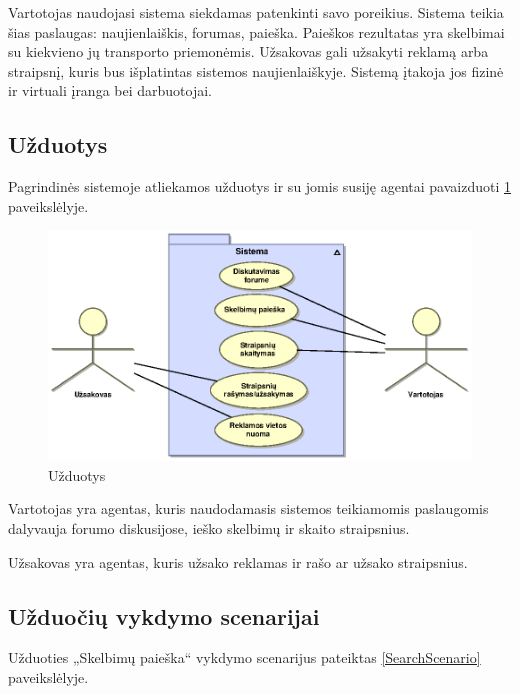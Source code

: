 \documentclass[12pt]{article}
\begin{document}
	Vartotojas naudojasi sistema siekdamas patenkinti savo poreikius. Sistema teikia šias paslaugas: naujienlaiškis, forumas, paieška. Paieškos rezultatas yra skelbimai su kiekvieno jų transporto priemonėmis. Užsakovas gali užsakyti reklamą arba straipsnį, kuris bus išplatintas sistemos naujienlaiškyje. Sistemą įtakoja jos fizinė ir virtuali įranga bei darbuotojai.
	\pagebreak
	
	\subsection{Užduotys}
	
	 Pagrindinės sistemoje atliekamos užduotys ir su jomis susiję agentai pavaizduoti \ref{UseCase3} paveikslėlyje.
	
	
	\begin{figure}[h]
		\begin{center}
			\includegraphics[width=\textwidth]{AnalUzduotys.eps}
			\caption{Užduotys\label{UseCase3}}
		\end{center}
	\end{figure}
	
	Vartotojas yra agentas, kuris naudodamasis sistemos teikiamomis paslaugomis dalyvauja forumo diskusijose, ieško skelbimų ir skaito straipsnius.
	
	Užsakovas yra agentas, kuris užsako reklamas ir rašo ar užsako straipsnius.
	\pagebreak
	
	\subsection{Užduočių vykdymo scenarijai}
	
	Užduoties „Skelbimų paieška“ vykdymo scenarijus pateiktas \ref{SearchScenario} paveikslėlyje.
	
\end{document}
